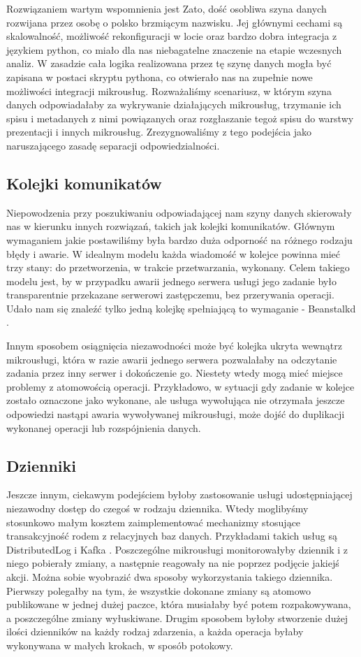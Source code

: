 \documentclass[licencjacka]{pracamgr}
\begin{document}
Rozwiązaniem wartym wspomnienia jest Zato, dość osobliwa szyna danych rozwijana przez osobę o polsko brzmiącym nazwisku. Jej głównymi cechami są skalowalność, możliwość rekonfiguracji w locie oraz bardzo dobra integracja z językiem python, co miało dla nas niebagatelne znaczenie na etapie wczesnych analiz. W zasadzie cała logika realizowana przez tę szynę danych mogła być zapisana w postaci skryptu pythona, co otwierało nas na zupełnie nowe możliwości integracji mikrousług. Rozważaliśmy scenariusz, w którym szyna danych odpowiadałaby za wykrywanie działających mikrousług, trzymanie ich spisu i metadanych z nimi powiązanych oraz rozgłaszanie tegoż spisu do warstwy prezentacji i innych mikrousług. Zrezygnowaliśmy z tego podejścia jako naruszającego zasadę separacji odpowiedzialności.

\subsection{Kolejki komunikatów}
Niepowodzenia przy poszukiwaniu odpowiadającej nam szyny danych skierowały nas w kierunku innych rozwiązań, takich jak
kolejki komunikatów. Głównym wymaganiem jakie postawiliśmy była bardzo duża odporność na różnego rodzaju błędy i
awarie. W idealnym modelu każda wiadomość w kolejce powinna mieć trzy stany: do przetworzenia, w trakcie przetwarzania, wykonany. Celem takiego modelu jest, by w przypadku awarii jednego serwera usługi jego zadanie było transparentnie przekazane serwerowi zastępczemu, bez przerywania operacji. Udało nam się znaleźć tylko jedną kolejkę spełniającą to wymaganie - Beanstalkd \cite{beanstalkd}.

Innym sposobem osiągnięcia niezawodności może być kolejka ukryta wewnątrz mikrousługi, która w razie awarii jednego serwera pozwalałaby na odczytanie zadania przez inny serwer i dokończenie go. Niestety wtedy mogą mieć miejsce problemy z atomowością operacji. Przykładowo, w sytuacji gdy zadanie w kolejce zostało oznaczone jako wykonane, ale usługa wywołująca nie otrzymała jeszcze odpowiedzi nastąpi awaria wywoływanej mikrousługi, może dojść do duplikacji wykonanej operacji lub rozspójnienia danych.

\subsection{Dzienniki}

Jeszcze innym, ciekawym podejściem byłoby zastosowanie usługi udostępniającej niezawodny dostęp do czegoś w rodzaju dziennika. Wtedy moglibyśmy stosunkowo małym kosztem zaimplementować mechanizmy stosujące transakcyjność rodem z relacyjnych baz danych. Przykładami takich usług są DistributedLog \cite{distibutedlog} i Kafka \cite{kafka}. Poszczególne mikrousługi monitorowałyby dziennik i z niego pobierały zmiany, a następnie reagowały na nie poprzez podjęcie jakiejś akcji. Można sobie wyobrazić dwa sposoby wykorzystania takiego dziennika. Pierwszy polegałby na tym, że wszystkie dokonane zmiany są atomowo publikowane w jednej dużej paczce, która musiałaby być potem rozpakowywana, a poszczególne zmiany wyłuskiwane. Drugim sposobem byłoby stworzenie dużej ilości dzienników na każdy rodzaj zdarzenia, a każda operacja byłaby wykonywana w małych krokach, w sposób potokowy.
\end{document}
